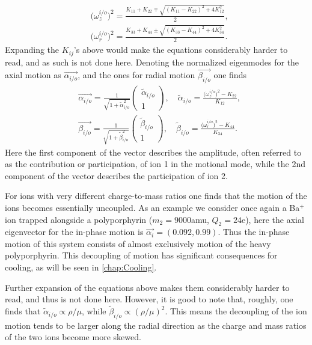 \begin{align}
    &\big(\omega_z^{i/o}\big)^2 = \frac{K_{11}+K_{22}\mp\sqrt{(K_{11}-K_{22})^2+4K_{12}^2}}{2},\\
    &\big(\omega_r^{i/o}\big)^2 = \frac{K_{33}+K_{44}\pm\sqrt{(K_{33}-K_{44})^2+4K_{34}^2}}{2}.
\end{align}
Expanding the $K_{ij}$'s above would make the equations considerably harder to read, and as such is not done here. Denoting the normalized eigenmodes for the axial motion as $\vec{\alpha_{i/o}}$, and the ones for radial motion $\vec{\beta_{i/o}}$ one finds
\begin{align}
    &\vec{\alpha_{i/o}} = \frac{1}{\sqrt{1+\tilde{\alpha}_{i/o}^2}}
    \begin{pmatrix}
        \tilde{\alpha}_{i/o} \\
        1
    \end{pmatrix},\quad \tilde{\alpha}_{i/o} = \frac{\big(\omega_z^{i/o}\big)^2-K_{22}}{K_{12}},\\
    &\vec{\beta_{i/o}} = \frac{1}{\sqrt{1+\tilde{\beta}_{i/o}^2}}
    \begin{pmatrix}
        \tilde{\beta}_{i/o} \\
        1
    \end{pmatrix},\quad \tilde{\beta}_{i/o} = \frac{\big(\omega_r^{i/o}\big)^2-K_{44}}{K_{34}}.
\end{align}
Here the first component of the vector describes the amplitude, often referred to as the contribution or participation, of ion 1 in the motional mode, while the 2nd component of the vector describes the participation of ion 2.


For ions with very different charge-to-mass ratios one finds that the motion of the ions becomes essentially uncoupled. As an example we consider once again a Ba$^+$ ion trapped alongside a polyporphyrin ($m_2 = 9000$amu, $Q_2 = 24$e), here the axial eigenvector for the in-phase motion is $\vec{\alpha_{i}} = (0.092,0.99)$. Thus the in-phase motion of this system consists of almost exclusively motion of the heavy polyporphyrin. This decoupling of motion has significant consequences for cooling, as will be seen in \cref{chap:Cooling}.


Further expansion of the equations above makes them considerably harder to read, and thus is not done here. However, it is good to note that, roughly, one finds that $\tilde{\alpha}_{i/o}\propto\rho/\mu$, while $\tilde{\beta}_{i/o}\propto(\rho/\mu)^2$. This means the decoupling of the ion motion tends to be larger along the radial direction as the charge and mass ratios of the two ions become more skewed.
